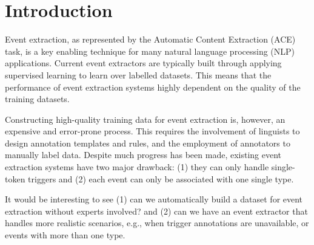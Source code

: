 \section{Introduction}
%

Event extraction, as represented by the Automatic Content Extraction (ACE) task, is a key enabling 
technique for many natural language processing (NLP) applications.  Current event extractors are typically built through applying supervised learning to learn over labelled datasets. This means that the performance of event extraction systems highly dependent on the quality of the training datasets.

Constructing high-quality training data for event extraction is, however, an expensive and error-prone process. This requires the involvement of linguists to design annotation templates and rules, and the employment of annotators to manually label data. Despite much progress has been made, existing event extraction systems have two major drawback: (1) they can only handle single-token triggers and (2)  each event can only be associated with one single type.


It would be interesting to see (1) can we automatically build a dataset for event extraction without experts involved?
and (2) can we have an event extractor that handles more realistic scenarios, e.g.,  when trigger annotations are unavailable, or events with more than one type.

